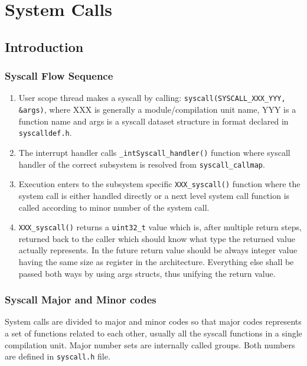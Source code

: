 \part{System Calls}

\chapter{Introduction}

\section{Syscall Flow Sequence}

\begin{enumerate}
\item User scope thread makes a syscall by calling:
      \verb+syscall(SYSCALL_XXX_YYY, &args)+, where XXX is generally a
      module/compilation unit name, YYY is a function name and args is a
      syscall dataset structure in format declared in \verb+syscalldef.h+.

\item The interrupt handler calls \verb+_intSyscall_handler()+ function where
      syscall handler of the correct subsystem is resolved from
      \verb+syscall_callmap+.

\item Execution enters to the subsystem specific \verb+XXX_syscall()+
      function where the system call is either handled directly or a next level
      system call function is called according to minor number of
      the system call.

\item \verb+XXX_syscall()+ returns a \verb+uint32_t+ value which is, after
      multiple return steps, returned back to the caller which should know
      what type the returned value actually represents. In the future return
      value should be always integer value having the same size as register
      in the architecture. Everything else shall be passed both ways by using
      args structs, thus unifying the return value.
\end{enumerate}


\section{Syscall Major and Minor codes}

System calls are divided to major and minor codes so that major codes represents
a set of functions related to each other, usually all the syscall functions in a
single compilation unit. Major number sets are internally called groups. Both
numbers are defined in \verb+syscall.h+ file.


